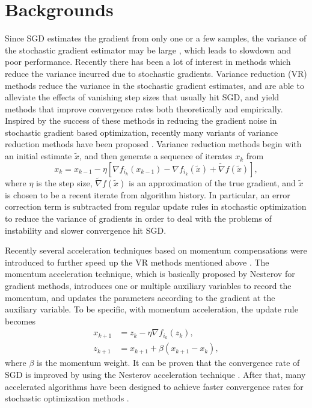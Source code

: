 \section{Backgrounds}
Since SGD estimates the gradient from only one or a few samples, the variance of the stochastic gradient estimator may be large \cite{Johnson12,Zhao2015}, which leads to slowdown and poor performance. Recently there has been a lot of interest in methods which reduce the variance incurred due to stochastic
gradients. Variance reduction (VR) methods \cite{Johnson12,Defazio2014} reduce the variance in the stochastic gradient estimates, and are able to alleviate the effects of vanishing step sizes that usually hit SGD, and yield methods that improve convergence rates both theoretically and empirically. 
Inspired by the success of these methods in reducing the gradient noise in stochastic gradient based optimization, recently many variants of variance reduction methods have been proposed \cite{Konecny2016,Li2016,Xiao2014,Allen-Zhu2016,shang2018guaranteed}. Variance reduction methods begin with an initial estimate $\widetilde{x}$, and then generate a sequence of iterates $x_k$ from
\[x_k = x_{k-1} - \eta\left[\nabla f_{i_k}(x_{k-1})-\nabla f_{i_k}(\widetilde{x}) + \widetilde{\nabla}f(\widetilde{x})\right],
\]
where $\eta$ is the step size, $\widetilde{\nabla}f(\widetilde{x})$ is an approximation of the true gradient, and $\widetilde{x}$ is chosen to be a recent iterate from algorithm history. In particular, an error correction term is subtracted from regular update rules in stochastic optimization to reduce the variance of gradients in order to deal with the problems of instability and slower convergence hit SGD.


Recently several acceleration techniques based on momentum compensations were introduced to further speed up the VR methods mentioned above \cite{Hu2009,Lin2015,nitanda2014,Allen-Zhu17}. The momentum acceleration technique, which is basically proposed by Nesterov \cite{Nesterov2004} for gradient methods, introduces one or multiple auxiliary variables to record the momentum, and updates the parameters according to the gradient at the auxiliary variable. To be specific, with momentum acceleration, the update rule becomes
\begin{equation}
\begin{split}
x_{k+1}& = z_k-\eta \nabla f_{i_k}(z_k),\\
z_{k+1}& = x_{k+1} + \beta (x_{k+1}-x_{k}),
\end{split}
\end{equation}
where $\beta$ is the momentum weight. It can be proven that the convergence rate of SGD
is improved by using the Nesterov acceleration technique \cite{Hu2009}.
After that, many accelerated algorithms have been designed to achieve faster convergence rates for stochastic optimization methods \cite{Shalev-Shwartz2014,Allen-Zhu17,Fercoq2015,Lin2015}.

